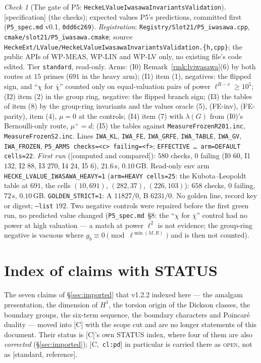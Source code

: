 \documentclass[11pt]{article}
\theoremstyle{remark}
\newtheorem{checkitem}[theorem]{Check}
\newcommand{\HA}[1]{[C,~\texttt{#1}]}      %
\newcommand{\STD}{\textsf{[standard, reference]}}
\newcommand{\CMPD}{\textsf{[computed and compared]}}   %
\newcommand{\SPEC}{\textsf{[specification]}}           %
\begin{document}
\begin{checkitem}[The gate of P5: \texttt{HeckeLValueIwasawaInvariantsValidation}]\label{chk:lviwasawa}
\SPEC{} (the checks); expected values P5's predictions, committed first (\texttt{P5\_spec.md} v0.1, \texttt{0dd6c269}). \emph{Registration}: \texttt{Registry/\allowbreak Slot21/\allowbreak P5\_iwasawa.cpp},
\texttt{cmake/\allowbreak slot21/\allowbreak P5\_iwasawa.cmake}; source \texttt{HeckeExt/\allowbreak LValue/\allowbreak HeckeLValue\allowbreak Iwasawa\allowbreak Invariants\allowbreak Validation.\{h,cpp\}}; the public APIs of WP-MEAS, WP-LIN
and WP-LV only, no existing file's code edited. Tier \texttt{standard}, read-only. Arms: (I0) Remark~\ref{rmk:lviwasawa}(6) by both routes at $15$ primes ($691$ in the heavy arm); (I1) item (1), negatives: the flipped sign, and
``$\chi$ for $\bar\chi$'' counted only on equal-valuation pairs of power $\ell^{R-v}\ge10^{5}$; (I2) item (2) in the group ring, negative: the flipped branch sign; (I3) the tables of item (8) by the group-ring invariants
and the values oracle (5), (FE-inv), (FE-parity), item (4), $\mu=0$ at the controls; (I4) item (7) with $\lambda(G)$ from (I0)'s Bernoulli-only route, $\mu^{+}=d$; (I5) the tables against
\texttt{MeasureFrozenR201.inc}, \texttt{MeasureFrozenS2.inc}. Lines \texttt{IWA\_KL}, \texttt{IWA\_FE}, \texttt{IWA\_GRFE}, \texttt{IWA\_TABLE}, \texttt{IWA\_GV}, \texttt{IWA\_FROZEN},
\texttt{P5\_ARMS checks=<c> failing=<f>}; \texttt{EFFECTIVE \dots{} arm=DEFAULT cells=22}. \emph{First run} (\CMPD): $580$ checks, $0$ failing (I0 $60$, I1 $132$, I2 $88$, I3 $270$, I4 $24$, I5 $6$),
$21.6$\,s, $0.10$\,GB. Read-only env arm \texttt{HECKE\_LVALUE\_IWASAWA\_HEAVY=1} (\texttt{arm=HEAVY cells=25}: the Kubota--Leopoldt table at $691$, the cells $(10,691)$, $(282,37)$, $(226,103)$):
$658$ checks, $0$ failing, $72$\,s, $0.10$\,GB. \texttt{GOLDEN\_STRICT=1}: A $11827/0$, B $6231/0$. No golden line, record key or digest; \texttt{--list} $192$. Two negative controls were repaired before the first green run,
no predicted value changed (\texttt{P5\_spec.md}~\S8: the ``$\chi$ for $\bar\chi$'' control had no power at high valuation --- a match at power $\ell^{2}$ is not evidence; the group-ring negative is vacuous where
$g_b\equiv0\pmod{\ell^{\min(M,R)}}$ and is then not counted).
\end{checkitem}

\appendix
\section{Index of claims with STATUS}\label{app:claims}
\noindent The seven claims of \S\ref{sec:imported} that v1.2.2 indexed here --- the amalgam
presentation, the dimension of $H^1$, the torsion origin of the Dickson classes, the boundary
groups, the six-term sequence, the boundary characters and Poincar\'e duality --- moved into
[C] with the scope cut and are no longer statements of this document. Their status is [C]'s
own STATUS index, where four of them are also \emph{corrected}
(\S\ref{sec:imported}); \HA{cl:pd} in particular is carried there as \textsc{open}, not as
\STD.
\end{document}

